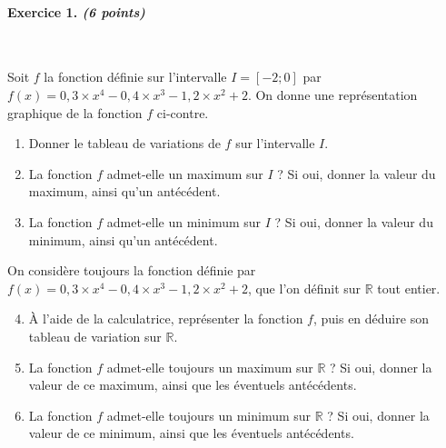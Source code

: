\documentclass[11pt]{article}
\begin{document}
\paragraph{Exercice 1. \emph{(6 points)}}~\\
\begin{minipage}{.6\textwidth}
  Soit $f$ la fonction définie sur l'intervalle $I=[-2; 0]$ par
  $f(x)=0,3\times x^4-0,4\times x^3-1,2\times x^2+2$. On donne une représentation graphique de la fonction
  $f$ ci-contre.
  \begin{enumerate}[leftmargin=*]
    \item Donner le tableau de variations de $f$ sur l'intervalle $I$.
    \item La fonction $f$ admet-elle un maximum sur $I$ ? Si oui, donner la
      valeur du maximum, ainsi qu'un antécédent.
    \item La fonction $f$ admet-elle un minimum sur $I$ ? Si oui, donner la
      valeur du minimum, ainsi qu'un antécédent.
  \end{enumerate}
\end{minipage}
\begin{minipage}{.4\textwidth}
  \begin{center}
  \end{center}
\end{minipage}
On considère toujours la fonction définie par $f(x)=0,3\times x^4-0,4\times
x^3-1,2\times x^2+2$, que
l'on définit sur $\mathbb{R}$ tout entier.
\begin{enumerate}[leftmargin=*]
    \setcounter{enumi}{3}
  \item À l'aide de la calculatrice, représenter la fonction $f$, puis en
    déduire son tableau de variation sur $\mathbb{R}$.
  \item La fonction $f$ admet-elle toujours un maximum sur $\mathbb{R}$ ? Si
    oui, donner la valeur de ce maximum, ainsi que les éventuels antécédents.
  \item La fonction $f$ admet-elle toujours un minimum sur $\mathbb{R}$ ? Si
    oui, donner la valeur de ce minimum, ainsi que les éventuels antécédents.
\end{enumerate}
\end{document}
